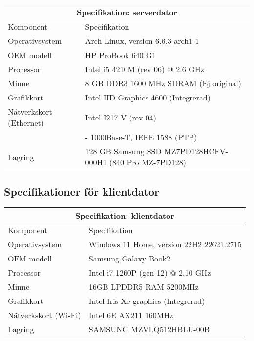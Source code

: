 \documentclass[journal,comsoc]{IEEEtran}
\begin{document}
\begin{table} [H]
  \begin{center}
    \label{table:serverspecs}
    \begin{tabular}{ | m{3cm} | m{4cm}| } 
      \hline
      \multicolumn{2}{|c|}{Specifikation: serverdator} \\
      \hline
      Komponent & Specifikation \\
      \hline
      Operativsystem & Arch Linux, version 6.6.3-arch1-1\\
      \hline
      OEM modell & HP ProBook 640 G1 \cite{hp:probook640}\\
      \hline
      Processor & Intel i5 4210M (rev 06) @ 2.6 GHz \cite{intel:4210m}\\
      \hline
      Minne & 8 GB DDR3 1600 MHz SDRAM (Ej original)\\
      \hline
      Grafikkort & Intel HD Graphics 4600 (Integrerad) \cite{intel:4210m}\\
      \hline
      Nätverkskort (Ethernet) & Intel I217-V (rev 04)\\ 
      \hline
      & - 1000Base-T, IEEE 1588 (PTP) \cite{intel:i217-v}\\
      \hline
      Lagring & 128 GB Samsung SSD MZ7PD128HCFV-000H1 (840 Pro MZ-7PD128)\cite{samsung:840pro}\\
      \hline
    \end{tabular}
  \end{center}
\end{table}

\subsection{Specifikationer för klientdator}
\begin{table} [H]
  \begin{center}
    \label{table:clientspecs}
    \begin{tabular}{ | m{3cm} | m{4cm}| } 
      \hline
      \multicolumn{2}{|c|}{Specifikation: klientdator} \\
      \hline
      Komponent & Specifikation \\
      \hline
      Operativsystem &  Windows 11 Home, version 22H2 22621.2715 \\
      \hline
      OEM modell &  Samsung Galaxy Book2 \\
      \hline
      Processor &  Intel i7-1260P (gen 12) @ 2.10 GHz \\
      \hline
      Minne & 16GB LPDDR5 RAM 5200MHz \\
      \hline
      Grafikkort &  Intel Iris Xe graphics (Integrerad) \\
      \hline
      Nätverkskort (Wi-Fi) & Intel 6E AX211 160MHz \\
      \hline
      Lagring & SAMSUNG MZVLQ512HBLU-00B \\
      \hline
    \end{tabular}
  \end{center}
\end{table}
\label{appendix:net}
\end{document}
